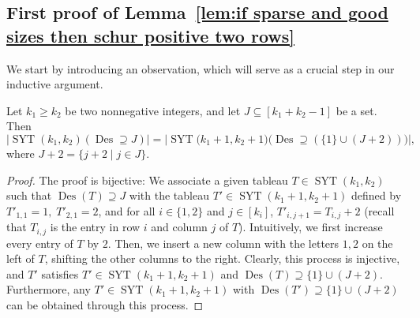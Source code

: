 \documentclass[ALCO]{cedram}
\newcommand{\Des}{\operatorname{Des}}
\newcommand{\Syt}{\operatorname{SYT}}
\begin{document}
\subsection{First proof of Lemma~\ref{lem:if sparse and good sizes then schur positive two rows}}
\label{subsec:proof if sparse and good sizes then schur positive two rows by induction}
We start by introducing an observation, which will serve as a crucial step in our inductive argument.
\begin{lemma}
\label{lem:remove first descent from syt}
    Let $k_1 \ge k_2$ be two nonnegative integers, and let $J \subseteq [k_1 + k_2 - 1]$ be a set. Then
    \[
        \left|\Syt(k_1, k_2)(\Des \supseteq J)\right| = \left|\Syt\big(k_1+1, k_2+1\big)\big(\Des \supseteq (\{1\}\cup (J+2))\big)\right|,
    \]
    where $J+2 = \{j + 2 \mid j \in J\}$.
\end{lemma}
\begin{proof}
    The proof is bijective: We associate a given tableau $T \in \Syt(k_1, k_2)$ such that $\Des(T) \supseteq J$ with the tableau $T' \in \Syt(k_1+1, k_2+1)$ defined by $T'_{1,1} = 1,\; T'_{2,1} = 2$, and for all $i \in \{1,2\}$ and $j \in [k_i]$, $T'_{i,j+1} = T_{i,j}+2$ (recall that $T_{i,j}$ is the entry in row $i$ and column $j$ of $T$). Intuitively, we first increase every entry of $T$ by $2$. Then, we insert a new column with the letters $1,2$ on the left of $T$, shifting the other columns to the right. Clearly, this process is injective, and $T'$ satisfies $T' \in \Syt(k_1+1, k_2+1)$ and $\Des(T) \supseteq \{1\}\cup (J+2)$. Furthermore, any $T' \in \Syt(k_1+1, k_2+1)$ with $\Des(T') \supseteq \{1\}\cup (J+2)$ can be obtained through this process.
\end{proof}
\end{document}

